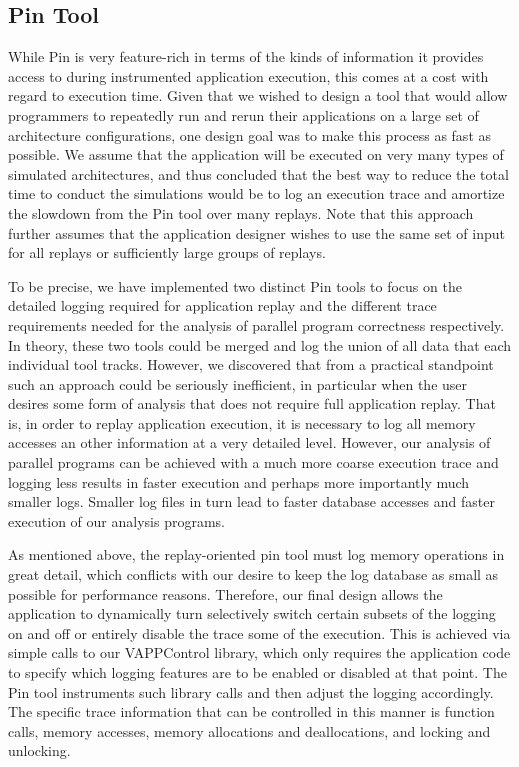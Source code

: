 \subsection{Pin Tool}
While Pin is very feature-rich in terms of the kinds of information
it provides access to during instrumented application execution, this
comes at a cost with regard to execution time.  Given that we wished to
design a tool that would allow programmers to repeatedly run and rerun
their applications on a large set of architecture configurations,
one design goal was to make this process as fast as possible.  We assume
that the application will be executed on very many types of simulated
architectures, and thus concluded that the best way to reduce the
total time to conduct the simulations would be to log an execution trace
and amortize the slowdown from the Pin tool over many replays.  Note that
this approach further assumes that the application designer wishes to
use the same set of input for all replays or sufficiently large
groups of replays.

To be precise, we have implemented two distinct Pin tools to focus
on the detailed logging required for application replay and the
different trace requirements needed for the analysis of parallel
program correctness respectively.  In theory, these two tools could
be merged and log the union of all data that each individual tool
tracks.  However, we discovered that from a practical standpoint
such an approach could be seriously inefficient, in particular
when the user desires some form of analysis that does not
require full application replay.  That is, in order to replay
application execution, it is necessary to log all memory accesses
an other information at a very detailed level.  However, our
analysis of parallel programs can be achieved with a much more
coarse execution trace and logging less results in faster execution
and perhaps more importantly much smaller logs.  Smaller log files in
turn lead to faster database accesses and faster execution of our
analysis programs.

As mentioned above, the replay-oriented pin tool must log memory
operations in great detail, which conflicts with our desire to
keep the log database as small as possible for performance reasons.
Therefore, our final design allows the application to dynamically
turn selectively switch certain subsets of the logging on and off
or entirely disable the trace some of the execution.  This is
achieved via simple calls to our VAPPControl library, which 
only requires the application code to specify which logging
features are to be enabled or disabled at that point.
The Pin tool instruments such library calls and then adjust the
logging accordingly.  The specific trace information that can
be controlled in this manner is function calls, memory accesses,
memory allocations and deallocations, and locking and unlocking.

